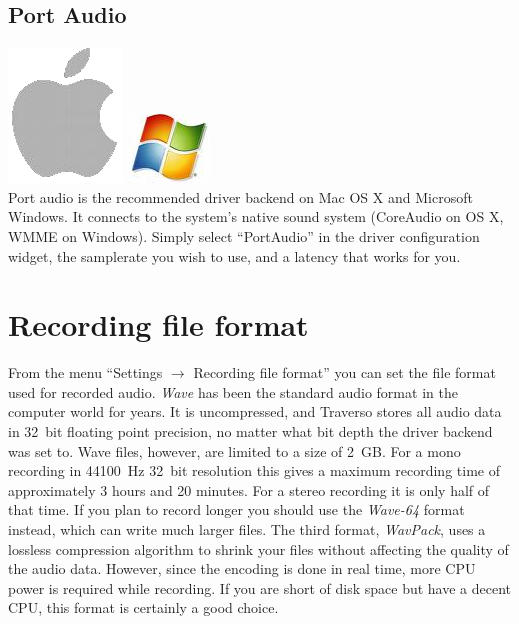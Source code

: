 \subsection{Port Audio}
\includegraphics[height=\baselineskip]{images/mac.png}
\includegraphics[height=\baselineskip]{images/win.png}
\\
Port audio is the recommended driver backend on Mac OS X and Microsoft Windows. It connects to the system's native sound system (CoreAudio on OS X, WMME on Windows). Simply select ``PortAudio'' in the driver configuration widget, the samplerate you wish to use, and a latency that works for you.

\section{Recording file format}
From the menu ``Settings $\rightarrow$ Recording file format'' you can set the file format used for recorded audio. \emph{Wave} has been the standard audio format in the computer world for years. It is uncompressed, and Traverso stores all audio data in 32~bit floating point precision, no matter what bit depth the driver backend was set to. Wave files, however, are limited to a size of 2~GB. For a mono recording in 44100~Hz 32~bit resolution this gives a maximum recording time of approximately 3 hours and 20 minutes. For a stereo recording it is only half of that time. If you plan to record longer you should use the \emph{Wave-64} format instead, which can write much larger files. The third format, \emph{WavPack}, uses a lossless compression algorithm to shrink your files without affecting the quality of the audio data. However, since the encoding is done in real time, more CPU power is required while recording. If you are short of disk space but have a decent CPU, this format is certainly a good choice.
